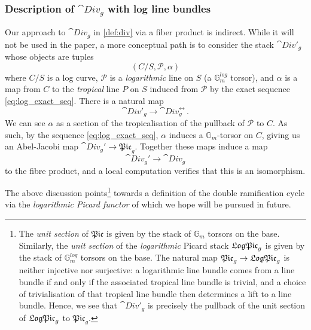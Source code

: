 \documentclass[a4paper,12pt]{article} %
\newcommand{\bb}[1]{{\mathbb{#1}}}
\newcommand{\ca}[1]{{\mathcal{#1}}}
\theoremstyle{definition}
\theoremstyle{plain}%
\newcommand{\Picabs}{\mathfrak{Pic}}
\begin{document}
\subsubsection{Description of \texorpdfstring{$\cat{Div}_g$}{Div\_g} with log line bundles}
Our approach to $\cat{Div}_g$ in \cref{def:div} via
a fiber product is indirect.
While it will not be used in the paper, a more conceptual path is to consider the stack $\cat{Div}'_g$ whose objects are tuples
\begin{equation*}
(C/S, \ca P, \alpha)
\end{equation*}
where $C/S$ is a log curve, $\ca P$ is a \emph{logarithmic} line on $S$  (a $\bb G_m^{log}$ torsor), and $\alpha$ is a map from $C$ to the \emph{tropical} line $P$ on $S$ induced from $\ca P$ by the exact sequence \eqref{eq:log_exact_seq}. 
There is a natural map 
$$\cat{Div}'_g \to \cat{Div}^{\rel}_g\, .$$ We can see $\alpha$ as a section of the tropicalisation of the pullback of $\ca P$ to $C$. As such, by the sequence \eqref{eq:log_exact_seq}, $\alpha$ induces a $\bb G_m$-torsor on $C$, giving us an Abel-Jacobi map $\cat{Div}_g'\to \Picabs_g$. Together these maps induce a map 
\begin{equation*}
\cat{Div}_g' \to \cat{Div}_g
\end{equation*}
to the fibre product, and a local computation verifies that this is an isomorphism. 

 The above discussion points\footnote{The {\it unit section} of $\Picabs$ is given by the stack of $\bb G_m$ torsors on the base. Similarly, the {\it unit section} of the \emph{logarithmic} Picard stack $\frak{LogPic}_g$ is given by the stack of $\bb G_m^{log}$ torsors on the base. The natural map $\Picabs_g \to \frak{LogPic}_g$ is neither injective nor surjective: a logarithmic line bundle comes from a line bundle if and only if the associated tropical line bundle is trivial, and a choice of trivialisation of that tropical line bundle then determines a lift to a line bundle. Hence, we see that $\cat{Div}'_g$ is precisely the pullback of the unit section of $\frak{LogPic}_g$ to $\Picabs_g$.} towards a definition of the double ramification cycle via the \emph{logarithmic Picard functor} of \cite{Molcho2018The-logarithmic}
which we hope will be pursued in future. 


\end{document}
